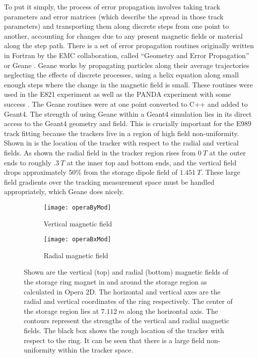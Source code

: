 To put it simply, the process of error propagation involves taking track parameters and error matrices (which describe the spread in those track parameters) and transporting them along discrete steps from one point to another, accounting for changes due to any present magnetic fields or material along the step path. There is a set of error propagation routines originally written in Fortran by the EMC collaboration, called ``Geometry and Error Propagation'' or Geane \cite{geanemanual}. Geane works by propagating particles along their average trajectories neglecting the effects of discrete processes, using a helix equation along small enough steps where the change in the magnetic field is small. These routines were used in the E821 experiment as well as the PANDA experiment with some success \cite{Lavezzi}. The Geane routines were at one point converted to C++ and added to Geant4. The strength of using Geane within a Geant4 simulation lies in its direct access to the Geant4 geometry and field. This is crucially important for the E989 track fitting because the trackers live in a region of high field non-uniformity. Shown in  is the location of the tracker with respect to the radial and vertical fields. As shown the radial field in the tracker region rises from $\SI{0}{T}$ at the outer ends to roughly $\SI{.3}{T}$ at the inner top and bottom ends, and the vertical field drops approximately 50\% from the storage dipole field of $\SI{1.451}{T}$. These large field gradients over the tracking measurement space must be handled appropriately, which Geane does nicely.



\begin{figure}[]
\centering
    \begin{subfigure}[]{0.75\textwidth}
        \centering
        \texttt{[image: operaByMod]}
        \caption{Vertical magnetic field}
    \label{fig:operaBy}
    \end{subfigure}%
    \vspace{5mm}
    \begin{subfigure}[]{0.75\textwidth}
        \centering
        \texttt{[image: operaBxMod]}
        \caption{Radial magnetic field}
    \label{fig:operaBx}
    \end{subfigure}
\caption[Vertical and radial magnetic fields calculated in Opera2D]{Shown are the vertical (top) and radial (bottom) magnetic fields of the storage ring magnet in and around the storage region as calculated in Opera 2D. The horizontal and vertical axes are the radial and vertical coordinates of the ring respectively. The center of the storage region lies at $\SI{7.112}{m}$ along the horizontal axis. The contours represent the strengths of the vertical and radial magnetic fields. The black box shows the rough location of the tracker with respect to the ring. It can be seen that there is a large field non-uniformity within the tracker space.}
\label{fig:Opera2DFields}
\end{figure}


